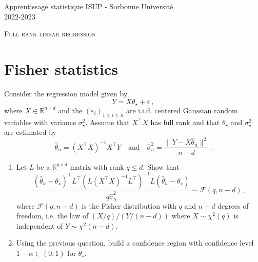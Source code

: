 \documentclass[a4paper,10pt,fleqn]{article}
\newcommand{\eqsp}{\,}
\newcommand{\rset}{\ensuremath{\mathbb{R}}}
\newcommand{\1}{\ensuremath{\mathbbm{1}}}
\newcommand{\param}{\theta}
\begin{document}
\noindent Apprentissage statistique \hfill ISUP - Sorbonne Universit\'e \\
 2022-2023

\noindent\hrulefill

\begin{center}
\textsc{Full rank linear regression}
\end{center}
\hrulefill

\medskip


\section{Fisher statistics}
Consider the regression model given by
$$
Y = X\param_{\star}+ \varepsilon\eqsp,
$$
where $X\in\rset^{n\times d}$ and the $(\varepsilon_{i})_{1\leqslant i \leqslant n}$ are i.i.d. centered Gaussian random variables with variance $\sigma_{\star}^2$. Assume that $X^\top X$ has full rank and that $\param_\star$ and $\sigma_{\star}^2$ are estimated by 
$$
\widehat \param_n = (X^\top X)^{-1}X^\top Y\quad\mathrm{and}\quad \widehat \sigma^2_n =\frac{\|Y - X\widehat \param_n \|^2}{n-d}\eqsp.
$$
\begin{enumerate}
\item  Let $L$ be a $\rset^{q\times d}$ matrix with rank $q\leqslant d$. Show that
$$
\frac{(\widehat \param_{n} -\param_{\star})^\top L^\top(L(X^\top X)^{-1}L^\top)^{-1}L(\widehat \param_{n} -\param_{\star})}{q\widehat\sigma^2_{n}} \sim \mathcal{F}(q,n-d)\eqsp,
$$
where $\mathcal{F}(q,n-d)$ is the Fisher distribution with $q$ and $n-d$ degrees of freedom, i.e. the law of $(X/q)/(Y/(n-d))$ where $X\sim\chi^2(q)$ is independent of $Y\sim\chi^2(n-d)$.
\item Using the previous question, build a confidence region with confidence level $1-\alpha\in(0,1)$ for $\param_\star$.
\end{enumerate}
\end{document}
